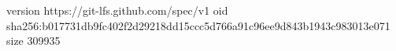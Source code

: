 version https://git-lfs.github.com/spec/v1
oid sha256:b017731db9fc402f2d29218dd15ccc5d766a91c96ee9d843b1943c983013e071
size 309935
